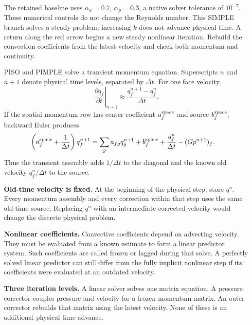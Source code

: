 The retained baseline uses $\alpha_u=0.7$, $\alpha_p=0.3$,
a native solver tolerance of $10^{-7}$. These numerical controls
do not change the Reynolds number. This SIMPLE branch solves a steady
problem; increasing $k$ does not advance physical time.
\newpage
{}
A return along the red arrow begins a new steady nonlinear iteration. Rebuild the convection coefficients from the latest velocity and check both momentum and continuity.

\newpage
{}
PISO and PIMPLE solve a transient momentum equation. Superscripts $n$ and $n+1$ denote physical time levels, separated by $\Delta t$. For one face velocity,
\[
\left.\frac{\partial q_f}{\partial t}\right|_{n+1}
\approx\frac{q_f^{n+1}-q_f^n}{\Delta t}.
\]
If the spatial momentum row has center coefficient $a_f^{\rm space}$ and source $b_f^{\rm space}$, backward Euler produces
\begin{align*}
\left(a_f^{\rm space}+\frac{1}{\Delta t}\right)q_f^{n+1}
&=\sum_g a_{fg}q_g^{n+1}+b_f^{\rm space}
+\frac{q_f^n}{\Delta t}-(Gp^{n+1})_f.
\end{align*}
Thus the transient assembly adds $1/\Delta t$ to the diagonal and the known old velocity $q_f^n/\Delta t$ to the source.

\textbf{Old-time velocity is fixed.} At the beginning of the physical step, store $q^n$. Every momentum assembly and every correction within that step uses the same old-time source. Replacing $q^n$ with an intermediate corrected velocity would change the discrete physical problem.

\textbf{Nonlinear coefficients.} Convective coefficients depend on advecting velocity. They must be evaluated from a known estimate to form a linear predictor system. Such coefficients are called frozen or lagged during that solve. A perfectly solved linear predictor can still differ from the fully implicit nonlinear step if its coefficients were evaluated at an outdated velocity.

\textbf{Three iteration levels.} A linear solver solves one matrix equation. A pressure corrector couples pressure and velocity for a frozen momentum matrix. An outer corrector rebuilds that matrix using the latest velocity. None of these is an additional physical time advance.

